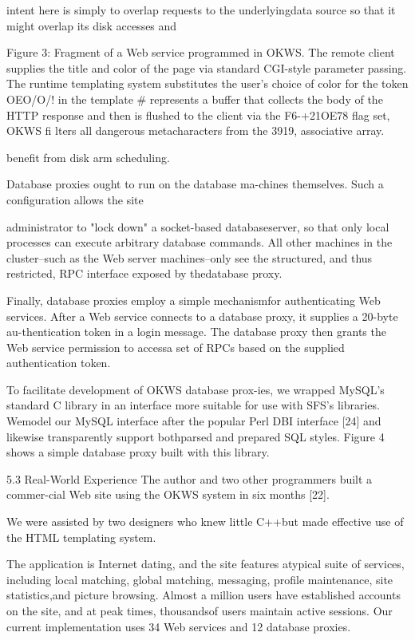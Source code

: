 intent here is simply to overlap requests to the underlyingdata source so that it might overlap its disk accesses and

Figure 3: Fragment of a Web service programmed in OKWS.
The remote client supplies the title and color of the page via
standard CGI-style parameter passing. The runtime templating
system substitutes the user's choice of color for the token OEO/O/!
in the template #%
represents a buffer that collects the body of the HTTP response and then is flushed to the client via %
the F6-+21OE78 flag set, OKWS fi lters all dangerous metacharacters from the 3919, associative array.

benefit from disk arm scheduling.

Database proxies ought to run on the database ma-chines themselves. Such a configuration allows the site

administrator to "lock down" a socket-based databaseserver, so that only local processes can execute arbitrary
database commands. All other machines in the cluster--such as the Web server machines--only see the structured, and thus restricted, RPC interface exposed by thedatabase proxy.

Finally, database proxies employ a simple mechanismfor authenticating Web services. After a Web service
connects to a database proxy, it supplies a 20-byte au-thentication token in a login message. The database
proxy then grants the Web service permission to accessa set of RPCs based on the supplied authentication token.

To facilitate development of OKWS database prox-ies, we wrapped MySQL's standard C library in an interface more suitable for use with SFS's libraries. Wemodel our MySQL interface after the popular Perl DBI
interface [24] and likewise transparently support bothparsed and prepared SQL styles. Figure 4 shows a simple
database proxy built with this library.

5.3 Real-World Experience
The author and two other programmers built a commer-cial Web site using the OKWS system in six months [22].

We were assisted by two designers who knew little C++but made effective use of the HTML templating system.

The application is Internet dating, and the site features atypical suite of services, including local matching, global
matching, messaging, profile maintenance, site statistics,and picture browsing. Almost a million users have established accounts on the site, and at peak times, thousandsof users maintain active sessions. Our current implementation uses 34 Web services and 12 database proxies.

